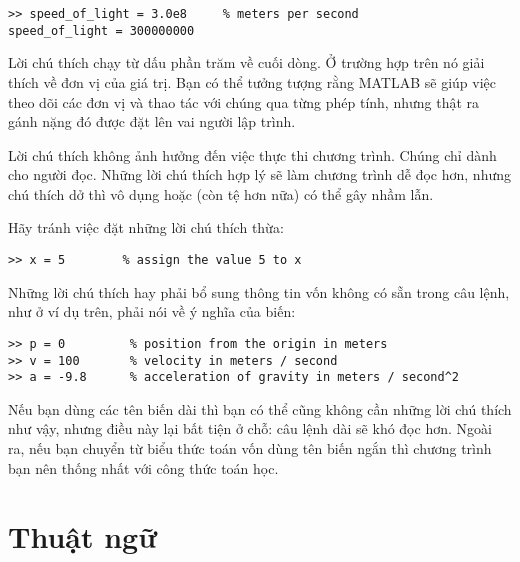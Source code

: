 \documentclass[12pt]{book}
\begin{document}
\begin{verbatim}
>> speed_of_light = 3.0e8     % meters per second
speed_of_light = 300000000
\end{verbatim}
%
Lời chú thích chạy từ dấu phần trăm về cuối dòng. Ở trường hợp trên
nó giải thích về đơn vị của giá trị. Bạn có thể tưởng tượng rằng MATLAB
sẽ giúp việc theo dõi các đơn vị và thao tác với chúng qua từng phép tính,
nhưng thật ra gánh nặng đó được đặt lên vai người lập trình.

Lời chú thích không ảnh hưởng đến việc thực thi chương trình. Chúng
chỉ dành cho người đọc. Những lời chú thích hợp lý sẽ làm chương trình
dễ đọc hơn, nhưng chú thích dở thì vô dụng hoặc (còn tệ hơn nữa)
có thể gây nhầm lẫn.

Hãy tránh việc đặt những lời chú thích thừa:

\begin{verbatim}
>> x = 5        % assign the value 5 to x
\end{verbatim}
%
Những lời chú thích hay phải bổ sung thông tin vốn không có sẵn trong
câu lệnh, như ở ví dụ trên, phải nói về ý nghĩa của biến:

\begin{verbatim}
>> p = 0         % position from the origin in meters 
>> v = 100       % velocity in meters / second
>> a = -9.8      % acceleration of gravity in meters / second^2
\end{verbatim}
%
Nếu bạn dùng các tên biến dài thì bạn có thể cũng không cần những
lời chú thích như vậy, nhưng điều này lại bất tiện ở chỗ: câu lệnh dài
sẽ khó đọc hơn. Ngoài ra, nếu bạn chuyển từ biểu thức toán vốn 
dùng tên biến ngắn thì chương trình bạn nên thống nhất với công
thức toán học.

\section{Thuật ngữ}
\end{document}
